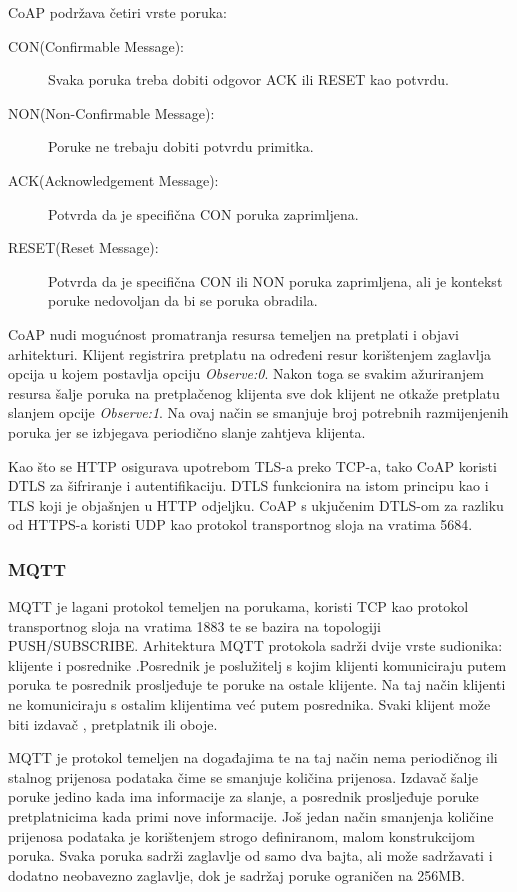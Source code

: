 \documentclass[times, utf8, diplomski]{fer}
\begin{document}
CoAP podržava četiri vrste poruka:
\begin{description}
    \item[CON(Confirmable Message):]Svaka poruka treba dobiti odgovor ACK ili RESET kao potvrdu.
    \item[NON(Non-Confirmable Message):]Poruke ne trebaju dobiti potvrdu primitka.
    \item[ACK(Acknowledgement Message):]Potvrda da je specifična CON poruka zaprimljena.
    \item[RESET(Reset Message):]Potvrda da je specifična CON ili NON poruka zaprimljena, ali je kontekst poruke nedovoljan da bi se poruka obradila.
\end{description}

CoAP nudi mogućnost promatranja resursa temeljen na pretplati i objavi arhitekturi. Klijent registrira pretplatu na određeni resur korištenjem zaglavlja opcija u kojem postavlja opciju \emph{Observe:0}. Nakon toga se svakim ažuriranjem resursa šalje poruka na pretplačenog klijenta sve dok klijent ne otkaže pretplatu slanjem opcije \emph{Observe:1}. Na ovaj način se smanjuje broj potrebnih razmijenjenih poruka jer se izbjegava periodično slanje zahtjeva klijenta.

Kao što se HTTP osigurava upotrebom TLS-a preko TCP-a, tako CoAP koristi DTLS  za šifriranje i autentifikaciju. DTLS funkcionira na istom principu kao i TLS koji je objašnjen u HTTP odjeljku. CoAP s ukjučenim DTLS-om za razliku od HTTPS-a koristi UDP kao protokol transportnog sloja na vratima 5684.

\subsubsection{MQTT}
MQTT  je lagani protokol temeljen na porukama, koristi TCP kao protokol transportnog sloja na vratima 1883 te se bazira na topologiji PUSH/SUBSCRIBE. Arhitektura MQTT protokola sadrži dvije vrste sudionika: klijente i posrednike .Posrednik je poslužitelj s kojim klijenti komuniciraju putem poruka te posrednik prosljeđuje te poruke na ostale klijente. Na taj način klijenti ne komuniciraju s ostalim klijentima već putem posrednika. Svaki klijent može biti izdavač , pretplatnik  ili oboje. 

MQTT je protokol temeljen na događajima te na taj način nema periodičnog ili stalnog prijenosa podataka čime se smanjuje količina prijenosa. Izdavač šalje poruke jedino kada ima informacije za slanje, a posrednik prosljeđuje poruke pretplatnicima kada primi nove informacije. Još jedan način smanjenja količine prijenosa podataka je korištenjem strogo definiranom, malom konstrukcijom poruka. Svaka poruka sadrži zaglavlje od samo dva bajta, ali može sadržavati i dodatno neobavezno zaglavlje, dok je sadržaj poruke ograničen na 256MB. 
\end{document}
